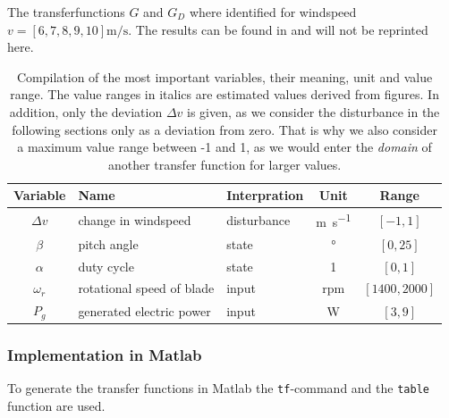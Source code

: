 The transferfunctions $G$ and $G_D$ where identified for windspeed $v=\left[6,7,8,9,10 \right] \si{\metre\per\second}$.
The results can be found in \cite[Table 2]{Fragoso_et_al_2017} and will not be reprinted here.

\begin{table}[H]
    \label{tab:analysis:import_var}
    \caption{Compilation of the most important variables, their meaning, unit and value range. The value ranges in italics are estimated values derived from figures. In addition, only the deviation $\Delta v$ is given, as we consider the disturbance in the following sections only as a deviation from zero. That is why we also consider a maximum value range between -1 and 1, as we would enter the \textit{domain} of another transfer function for larger values.}
    \centering
    \begin{tabular}{cllcc} \toprule
        Variable & Name & Interpration & Unit & Range \\ \midrule
        $\Delta v$ & change in windspeed & disturbance  & \si{\metre\per\second} & $\mathit{\left[-1,1\right]}$\\
        $\beta$ & pitch angle & state & \si{\degree}& $\left[0,25\right]$ \\
        $\alpha$ & duty cycle& state & 1 & $\left[0,1\right]$\\
        $\omega_r$ & rotational speed of blade & input & rpm & $\mathit{\left[1400,2000 \right]}$  \\
        $P_g$ &generated electric power &input & \si{\watt} &  $\mathit{\left[3,9 \right]}$\\ \bottomrule
    \end{tabular}
    \label{tab:analysis:constraints}
\end{table}

\subsubsection*{Implementation in Matlab}

To generate the transfer functions in Matlab the \texttt{tf}-command and the \texttt{table} function are used.

